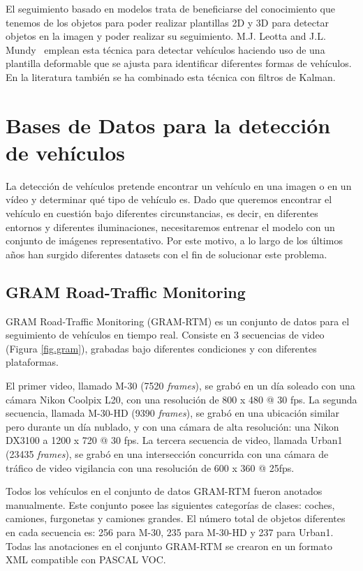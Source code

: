 El seguimiento basado en modelos trata de beneficiarse del conocimiento que tenemos de los objetos para poder realizar plantillas 2D y 3D para detectar objetos en la imagen y poder realizar su seguimiento. M.J. Leotta and J.L. Mundy~\cite{vehicle_surveillance_3d} emplean esta técnica para detectar vehículos haciendo uso de una plantilla deformable que se ajusta para identificar diferentes formas de vehículos. En la literatura también se ha combinado esta técnica con filtros de Kalman.


\section{Bases de Datos para la detección de vehículos}
\label{sec:dataset}

La detección de vehículos pretende encontrar un vehículo en una imagen o en un vídeo y determinar qué tipo de vehículo es. Dado que queremos encontrar el vehículo en cuestión bajo diferentes circunstancias, es decir, en diferentes entornos y diferentes iluminaciones, necesitaremos entrenar el modelo con un conjunto de imágenes representativo. Por este motivo, a lo largo de los últimos años han surgido diferentes datasets con el fin de solucionar este problema.

\subsection{GRAM Road-Traffic Monitoring}

GRAM Road-Traffic Monitoring (GRAM-RTM) \cite{gram-tracking} \cite{gram} es un conjunto de datos para el seguimiento de vehículos en tiempo real. Consiste en 3 secuencias de video (Figura \ref{fig.gram}), grabadas bajo diferentes condiciones y con diferentes plataformas.

El primer video, llamado M-30 (7520 \textit{frames}), se grabó en un día soleado con una cámara Nikon Coolpix L20, con una resolución de 800 x 480 @ 30 fps. La segunda secuencia, llamada M-30-HD (9390 \textit{frames}), se grabó en una ubicación similar pero durante un día nublado, y con una cámara de alta resolución: una Nikon DX3100 a 1200 x 720 @ 30 fps. La tercera secuencia de video, llamada Urban1 (23435 \textit{frames}), se grabó en una intersección concurrida con una cámara de tráfico de video vigilancia con una resolución de 600 x 360 @ 25fps.

Todos los vehículos en el conjunto de datos GRAM-RTM fueron anotados manualmente. Este conjunto posee las siguientes categorías de clases: coches, camiones, furgonetas y camiones grandes. El número total de objetos diferentes en cada secuencia es: 256 para M-30, 235 para M-30-HD y 237 para Urban1. Todas las anotaciones en el conjunto GRAM-RTM se crearon en un formato XML compatible con PASCAL VOC.

